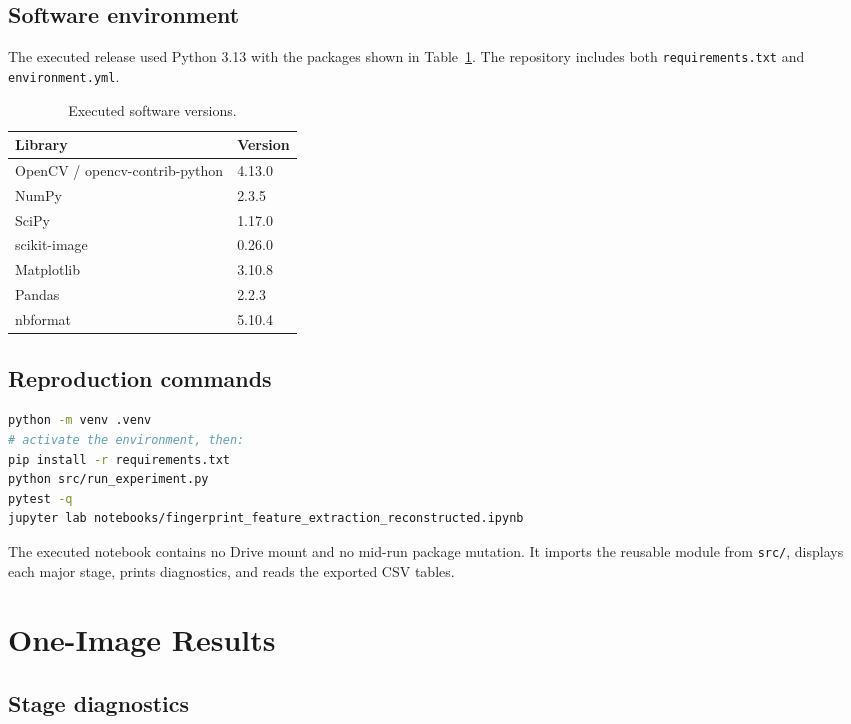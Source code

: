 \documentclass[11pt]{article}
\begin{document}
\subsection{Software environment}

The executed release used Python 3.13 with the packages shown in Table~\ref{tab:versions}. The repository includes both \texttt{requirements.txt} and \texttt{environment.yml}.

\begin{table}[H]
\centering
\caption{Executed software versions.}
\label{tab:versions}
\begin{tabular}{@{}ll@{}}
\toprule
Library & Version \\
\midrule
OpenCV / opencv-contrib-python & 4.13.0 \\
NumPy & 2.3.5 \\
SciPy & 1.17.0 \\
scikit-image & 0.26.0 \\
Matplotlib & 3.10.8 \\
Pandas & 2.2.3 \\
nbformat & 5.10.4 \\
\bottomrule
\end{tabular}
\end{table}

\subsection{Reproduction commands}

\begin{lstlisting}[language=bash,caption={Repository-level reproduction.}]
python -m venv .venv
# activate the environment, then:
pip install -r requirements.txt
python src/run_experiment.py
pytest -q
jupyter lab notebooks/fingerprint_feature_extraction_reconstructed.ipynb
\end{lstlisting}

The executed notebook contains no Drive mount and no mid-run package mutation. It imports the reusable module from \texttt{src/}, displays each major stage, prints diagnostics, and reads the exported CSV tables.

\section{One-Image Results}

\subsection{Stage diagnostics}
\end{document}
